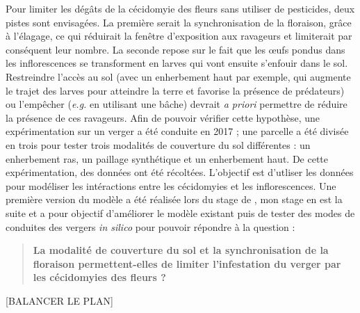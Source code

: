 Pour limiter les dégâts de la cécidomyie des fleurs sans utiliser de pesticides, deux pistes sont envisagées.
La première serait la synchronisation de la floraison, grâce à l'élagage, ce qui réduirait la fenêtre d'exposition aux ravageurs et limiterait par conséquent leur nombre.
La seconde repose sur le fait que les œufs pondus dans les inflorescences se transforment en larves qui vont ensuite s'enfouir dans le sol.
Restreindre l'accès au sol (avec un enherbement haut par exemple,  qui augmente le trajet des larves pour atteindre la terre et favorise la présence de prédateurs) ou l'empêcher (\emph{e.g.} en utilisant une bâche) devrait \emph{a priori} permettre de réduire la présence de ces ravageurs. 
Afin de pouvoir vérifier cette hypothèse, une expérimentation sur un verger a été conduite en 2017 ; une parcelle a été divisée en trois pour tester trois modalités de couverture du sol différentes : un enherbement ras, un paillage synthétique et un enherbement haut. De cette expérimentation, des données ont été récoltées. L'objectif est d'utliser les données pour modéliser les intéractions  entre les cécidomyies et les inflorescences.
Une première version du modèle a été réalisée lors du stage de \citet{laurie}, mon stage en est la suite et a pour objectif d'améliorer le modèle existant puis de tester des modes de conduites des vergers \emph{in silico} pour pouvoir répondre à la question :
\begin{quote}
 \textbf{La modalité de couverture du sol et la synchronisation de la floraison permettent-elles de limiter l'infestation du verger par les cécidomyies des fleurs ?}
\end{quote}

[BALANCER LE PLAN]

